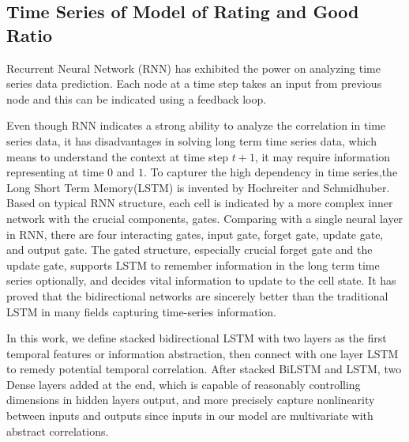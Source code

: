 \documentclass[12pt]{article}
\begin{document}
\newpage
\subsection{Time Series of Model of Rating and Good Ratio}
Recurrent Neural Network (RNN) has exhibited the power on analyzing time series data prediction. Each node at a time step takes an input from previous node and this can be indicated using a feedback loop.

Even though RNN indicates a strong ability to analyze the correlation in time series data, it has disadvantages in solving long term time series data, which means to understand the context at time step $t+1$, it may require information representing at time $0$ and $1$. To capturer the high dependency in time series,the Long Short Term Memory(LSTM) is invented by Hochreiter and Schmidhuber\cite{Hlstm}. Based on typical RNN structure, each cell is indicated by a more complex inner network with the crucial components, gates. Comparing with a single neural layer in RNN, there are four interacting gates, input gate, forget gate, update gate, and output gate. The gated structure, especially crucial forget gate and the update gate, supports LSTM to remember information in the long term time series optionally, and decides vital information to update to the cell state. It has proved that the bidirectional networks \cite{BiLSTM} are sincerely better than the traditional LSTM in many fields capturing time-series information. 

In this work, we define stacked bidirectional LSTM with two layers as the first temporal features or information abstraction, then connect with one layer LSTM to remedy potential temporal correlation. After stacked BiLSTM and LSTM, two Dense layers added at the end, which is capable of reasonably controlling dimensions in hidden layers output, and more precisely capture nonlinearity between inputs and outputs since inputs in our model are multivariate with abstract correlations.            
\end{document}
